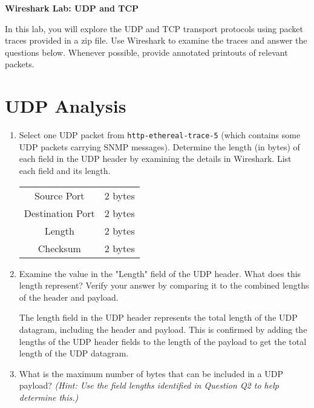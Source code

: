 \documentclass[12pt]{article}
\begin{document}
\begin{center}
    \Large \textbf{Wireshark Lab: UDP and TCP}
\end{center}

\vspace{1cm}

In this lab, you will explore the UDP and TCP transport protocols using packet traces provided in a zip file. Use Wireshark to examine the traces and answer the questions below. Whenever possible, provide annotated printouts of relevant packets.

\section*{UDP Analysis}

\begin{enumerate}[label=Q\arabic*:]
    \item Select one UDP packet from \texttt{http-ethereal-trace-5} (which
          contains some UDP packets carrying SNMP messages). Determine the length (in
          bytes) of each field in the UDP header by examining the details in
          Wireshark. List each field and its length.

          \begin{tabular}{cc}
              Source Port      & 2 bytes \\
              Destination Port & 2 bytes \\
              Length           & 2 bytes \\
              Checksum         & 2 bytes \\
          \end{tabular}

    \item Examine the value in the "Length" field of the UDP header. What does
          this length represent? Verify your answer by comparing it to the combined
          lengths of the header and payload.

          The length field in the UDP header represents the total length of the UDP
          datagram, including the header and payload. This is confirmed by adding the
          lengths of the UDP header fields to the length of the payload to get the
          total length of the UDP datagram.

    \item What is the maximum number of bytes that can be included in a UDP
          payload? \textit{(Hint: Use the field lengths identified in Question Q2 to
              help determine this.)}


\end{enumerate}
\end{document}

